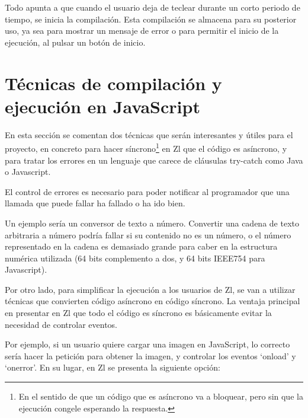 \documentclass{report}
\begin{document}
	\vspace{10px}
	
	Todo apunta a que cuando el usuario deja de teclear durante un corto periodo de tiempo, se inicia la compilación. Esta compilación se almacena para su posterior uso, ya sea para mostrar un mensaje de error o para permitir el inicio de la ejecución, al pulsar un botón de inicio.
	
	\section{Técnicas de compilación y ejecución en JavaScript}
	
	En esta sección se comentan dos técnicas que serán interesantes y útiles para el proyecto, en concreto para hacer síncrono\footnote{En el sentido de que un código que es asíncrono va a bloquear, pero sin que la ejecución congele esperando la respuesta.} en Zl que el código es asíncrono, y para tratar los errores en un lenguaje que carece de cláusulas try-catch como Java o Javascript.
	
		\vspace{10px}
	
	El control de errores es necesario para poder notificar al programador que una llamada que puede fallar ha fallado o ha ido bien. 
	
		\vspace{10px}
	
	Un ejemplo sería un conversor de texto a número. Convertir una cadena de texto arbitraria a número podría fallar si su contenido no es un número, o el número representado en la cadena es demasiado grande para caber en la estructura numérica utilizada (64 bits complemento a dos, y 64 bits IEEE754 para Javascript). 
	
		\vspace{10px}
	
	Por otro lado, para simplificar la ejecución a los usuarios de Zl, se van a utilizar técnicas que convierten código asíncrono en código síncrono. La ventaja principal en presentar en Zl que todo el código es síncrono es básicamente evitar la necesidad de controlar eventos. 
	
		\vspace{10px}
	
	Por ejemplo, si un usuario quiere cargar una imagen en JavaScript, lo correcto sería hacer la petición para obtener la imagen, y controlar los eventos `onload' y `onerror'. En su lugar, en Zl se presenta la siguiente opción:
	
\end{document}
